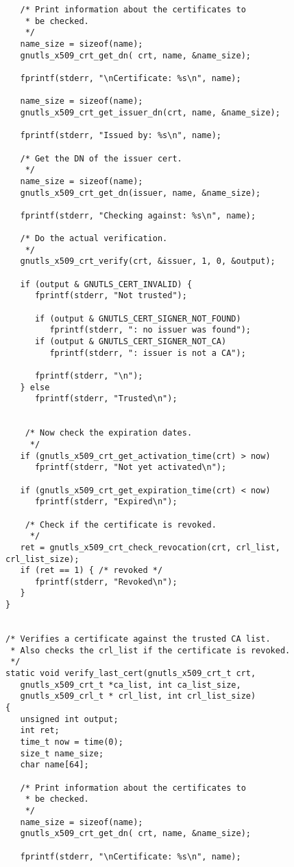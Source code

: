 \begin{verbatim}
   /* Print information about the certificates to
    * be checked.
    */
   name_size = sizeof(name);
   gnutls_x509_crt_get_dn( crt, name, &name_size);

   fprintf(stderr, "\nCertificate: %s\n", name);

   name_size = sizeof(name);
   gnutls_x509_crt_get_issuer_dn(crt, name, &name_size);

   fprintf(stderr, "Issued by: %s\n", name);

   /* Get the DN of the issuer cert.
    */
   name_size = sizeof(name);
   gnutls_x509_crt_get_dn(issuer, name, &name_size);

   fprintf(stderr, "Checking against: %s\n", name);

   /* Do the actual verification.
    */
   gnutls_x509_crt_verify(crt, &issuer, 1, 0, &output);

   if (output & GNUTLS_CERT_INVALID) {
      fprintf(stderr, "Not trusted");

      if (output & GNUTLS_CERT_SIGNER_NOT_FOUND)
         fprintf(stderr, ": no issuer was found");
      if (output & GNUTLS_CERT_SIGNER_NOT_CA)
         fprintf(stderr, ": issuer is not a CA");

      fprintf(stderr, "\n");
   } else
      fprintf(stderr, "Trusted\n");


    /* Now check the expiration dates.
     */
   if (gnutls_x509_crt_get_activation_time(crt) > now)
      fprintf(stderr, "Not yet activated\n");

   if (gnutls_x509_crt_get_expiration_time(crt) < now)
      fprintf(stderr, "Expired\n");

    /* Check if the certificate is revoked.
     */
   ret = gnutls_x509_crt_check_revocation(crt, crl_list, crl_list_size);
   if (ret == 1) { /* revoked */
      fprintf(stderr, "Revoked\n");
   }
}


/* Verifies a certificate against the trusted CA list.
 * Also checks the crl_list if the certificate is revoked.
 */
static void verify_last_cert(gnutls_x509_crt_t crt,
   gnutls_x509_crt_t *ca_list, int ca_list_size,
   gnutls_x509_crl_t * crl_list, int crl_list_size)
{ 
   unsigned int output;
   int ret;
   time_t now = time(0);
   size_t name_size;
   char name[64];

   /* Print information about the certificates to
    * be checked.
    */
   name_size = sizeof(name);
   gnutls_x509_crt_get_dn( crt, name, &name_size);

   fprintf(stderr, "\nCertificate: %s\n", name);


\end{verbatim}
